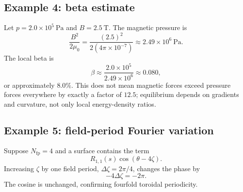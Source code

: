 \subsection{Example 4: beta estimate}
Let $p=2.0\times10^5\ \mathrm{Pa}$ and $B=2.5\ \mathrm T$. The magnetic pressure is
\begin{equation}
\frac{B^2}{2\mu_0}
=\frac{(2.5)^2}{2(4\pi\times10^{-7})}
\approx2.49\times10^6\ \mathrm{Pa}.
\end{equation}
The local beta is
\begin{equation}
\beta\approx\frac{2.0\times10^5}{2.49\times10^6}
\approx0.080,
\end{equation}
or approximately $8.0\%$. This does not mean magnetic forces exceed pressure forces everywhere by exactly a factor of $12.5$; equilibrium depends on gradients and curvature, not only local energy-density ratios.

\subsection{Example 5: field-period Fourier variation}
Suppose $N_{\mathrm{fp}}=4$ and a surface contains the term
\begin{equation}
R_{1,1}(s)\cos(\theta-4\zeta).
\end{equation}
Increasing $\zeta$ by one field period, $\Delta\zeta=2\pi/4$, changes the phase by
\begin{equation}
-4\Delta\zeta=-2\pi.
\end{equation}
The cosine is unchanged, confirming fourfold toroidal periodicity.

